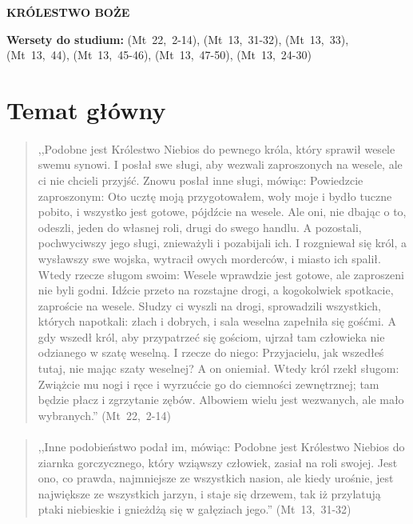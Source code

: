 \documentclass[10pt,a4paper,oneside]{article}
\begin{document}
\centerline{\textbf{\MakeUppercase{Królestwo Boże}}}
\begin{center}
\textbf{Wersety do studium:} 
\mbox{(Mt 22, 2-14)}, \mbox{(Mt 13, 31-32)}, \mbox{(Mt 13, 33)}, \mbox{(Mt 13, 44)}, \mbox{(Mt 13, 45-46)}, \mbox{(Mt 13, 47-50)}, \mbox{(Mt 13, 24-30)}
\end{center}
\section{Temat główny}
\paragraph{}
\begin{quote}
,,Podobne jest Królestwo Niebios do pewnego króla, który sprawił wesele swemu synowi. I posłał swe sługi, aby wezwali zaproszonych na wesele, ale ci nie chcieli przyjść. Znowu posłał inne sługi, mówiąc: Powiedzcie zaproszonym: Oto ucztę moją przygotowałem, woły moje i bydło tuczne pobito, i wszystko jest gotowe, pójdźcie na wesele. Ale oni, nie dbając o to, odeszli, jeden do własnej roli, drugi do swego handlu. A pozostali, pochwyciwszy jego sługi, znieważyli i pozabijali ich. I rozgniewał się król, a wysławszy swe wojska, wytracił owych morderców, i miasto ich spalił. Wtedy rzecze sługom swoim: Wesele wprawdzie jest gotowe, ale zaproszeni nie byli godni. Idźcie przeto na rozstajne drogi, a kogokolwiek spotkacie, zaproście na wesele. Słudzy ci wyszli na drogi, sprowadzili wszystkich, których napotkali: złach i dobrych, i sala weselna zapełniła się gośćmi. A gdy wszedł król, aby przypatrzeć się gościom, ujrzał tam człowieka nie odzianego w szatę weselną. I rzecze do niego: Przyjacielu, jak wszedłeś tutaj, nie mając szaty weselnej? A on oniemiał. Wtedy król rzekł sługom: Zwiążcie mu nogi i ręce i wyrzućcie go do ciemności zewnętrznej; tam będzie płacz i zgrzytanie zębów. Albowiem wielu jest wezwanych, ale mało wybranych.'' \mbox{(Mt 22, 2-14)}
\end{quote}
\paragraph{}
\begin{quote}
,,Inne podobieństwo podał im, mówiąc: Podobne jest Królestwo Niebios do ziarnka gorczycznego, który wziąwszy człowiek, zasiał na roli swojej. Jest ono, co prawda, najmniejsze ze wszystkich nasion, ale kiedy urośnie, jest największe ze wszystkich jarzyn, i staje się drzewem, tak iż przylatują ptaki niebieskie i gnieżdżą się w gałęziach jego.'' \mbox{(Mt 13, 31-32)}
\end{quote}
\end{document}

